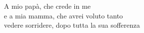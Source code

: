 \clearpage
\setcounter{page}{0}
\begin{flushright}
\null{}
A mio papà, che crede in me\\
e a mia mamma, che avrei voluto tanto\\
vedere sorridere, dopo tutta la sua sofferenza\\
\null
\end{flushright}
\clearpage
